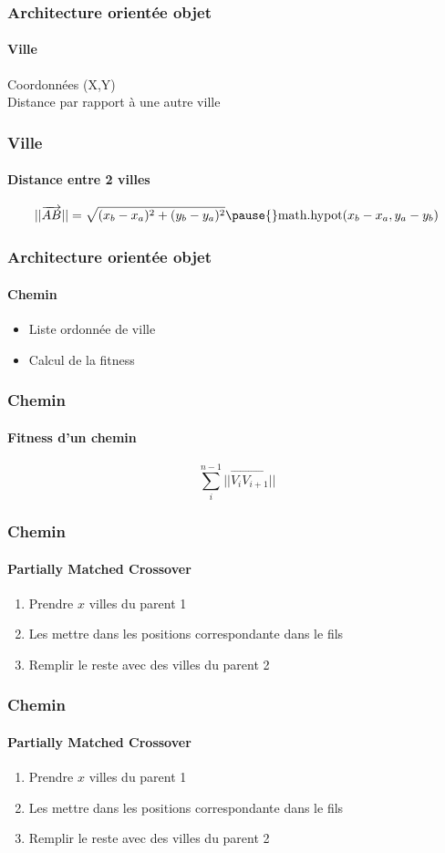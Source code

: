 \documentclass{beamer}
\begin{document}
\begin{frame}[fragile]
\frametitle{Architecture orientée objet}
\framesubtitle{\textbf{Ville}}
Coordonnées (X,Y) \\
Distance par rapport à une autre ville
\end{frame}

\begin{frame}
  \frametitle{Ville}
  \framesubtitle{Distance entre 2 villes}
  \begin{center}
  \[
    ||\overrightarrow{AB}|| = \sqrt{(x_b - x_a)^2 + (y_b - y_a)^2} \\
  \pause{}
  \text{math.hypot}(x_b - x_a, y_a -  y_b)
  \]
  \end{center}
\end{frame}

\begin{frame}
  \frametitle{Architecture orientée objet}
  \framesubtitle{\textbf{Chemin}}
  \begin{itemize}
    \item Liste ordonnée de ville
    \item Calcul de la fitness
  \end{itemize}
\end{frame}

\begin{frame}
  \frametitle{Chemin}
  \framesubtitle{Fitness d'un chemin}
  \[
    \sum_{i}^{n-1} ||\overrightarrow{V_{i}V_{i+1}}||
  \]
\end{frame}

\begin{frame}
  \frametitle{Chemin}
  \framesubtitle{Partially Matched Crossover}
    \begin{enumerate}
      \item Prendre $x$ villes du parent 1
      \item Les mettre dans les positions correspondante dans le fils
      \item Remplir le reste avec des villes du parent 2
    \end{enumerate}
\end{frame}

\begin{frame}
  \frametitle{Chemin}
  \framesubtitle{Partially Matched Crossover}
    \begin{enumerate}
      \item Prendre $x$ villes du parent 1
      \item Les mettre dans les positions correspondante dans le fils
      \item Remplir le reste avec des villes du parent 2
    \end{enumerate}
\end{frame}
\end{document}
